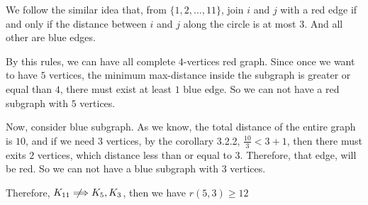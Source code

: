 \documentclass{article}
\newcommand{\notimplies}{%
  \mathrel{{\ooalign{\hidewidth$\not\phantom{=}$\hidewidth\cr$\implies$}}}}
\def\implies{\Longrightarrow}
\begin{document}
We follow the similar idea that, from $\{1, 2, ..., 11 \}$, join $i$ and $j$ with a red edge if and only if the distance between $i$ and $j$ along the circle is at most $3$. And all other are blue edges.

By this rules, we can have all complete $4$-vertices red graph. Since once we want to have $5$ vertices, the minimum max-distance inside the subgraph is greater or equal than $4$, there must exist at least $1$ blue edge. So we can not have a red subgraph with $5$ vertices. 

Now, consider blue subgraph. As we know, the total distance of the entire graph is $10$, and if we need $3$ vertices, by the corollary 3.2.2, $\frac{10}{3} < 3 + 1$, then there must exits $2$ vertices, which distance less than or equal to $3$. Therefore, that edge, will be red. So we can not have a blue subgraph with $3$ vertices. 

Therefore, $K_{11} \notimplies K_5, K_3$, then we have $r(5, 3) \ge 12$
\end{document}
